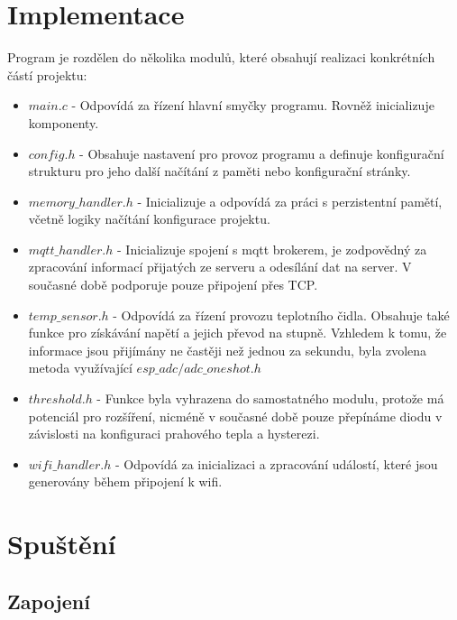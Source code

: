 \documentclass[12pt]{article}
\begin{document}
\section {Implementace}
Program je rozdělen do několika modulů, které obsahují realizaci konkrétních částí projektu:
\begin{itemize}
    \item \textbf{$main.c$} - Odpovídá za řízení hlavní smyčky programu. Rovněž inicializuje komponenty.
    \item \textbf{$config.h$} - Obsahuje nastavení pro provoz programu a definuje konfigurační strukturu pro jeho další načítání z paměti nebo konfigurační stránky.
    \item \textbf{$memory\_handler.h$} - Inicializuje a odpovídá za práci s perzistentní pamětí, včetně logiky načítání konfigurace projektu.
    \item \textbf{$mqtt\_handler.h$} - Inicializuje spojení s mqtt brokerem, je zodpovědný za zpracování informací přijatých ze serveru a odesílání dat na server. V současné době podporuje pouze připojení přes TCP.
    \item \textbf{$temp\_sensor.h$} - Odpovídá za řízení provozu teplotního čidla. Obsahuje také funkce pro získávání napětí a jejich převod na stupně. Vzhledem k tomu, že informace jsou přijímány ne častěji než jednou za sekundu, byla zvolena metoda využívající $esp\_adc/adc\_oneshot.h$
    \item \textbf{$threshold.h$} - Funkce byla vyhrazena do samostatného modulu, protože má potenciál pro rozšíření, nicméně v současné době pouze přepínáme diodu v závislosti na konfiguraci prahového tepla a hysterezi.
    \item \textbf{$wifi\_handler.h$} - Odpovídá za inicializaci a zpracování událostí, které jsou generovány během připojení k wifi.
\end{itemize}


\section {Spuštění}
\subsection{Zapojení}
\end{document}
